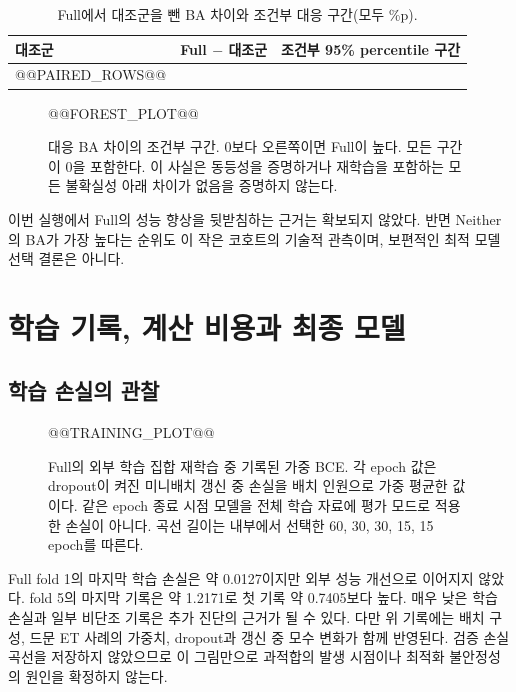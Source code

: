 \documentclass[11pt,a4paper]{article}
\numberwithin{equation}{section}
\begin{document}
\begin{table}[H]\centering\small
\caption{Full에서 대조군을 뺀 BA 차이와 조건부 대응 구간(모두 \%p).}
\begin{tabular}{@{}lrr@{}}\toprule
 대조군 & Full $-$ 대조군 & 조건부 95\% percentile 구간\\\midrule
@@PAIRED_ROWS@@
\bottomrule\end{tabular}\label{tab:paired}
\end{table}

\begin{figure}[H]\centering
@@FOREST_PLOT@@
\caption{대응 BA 차이의 조건부 구간. 0보다 오른쪽이면 Full이 높다.
모든 구간이 0을 포함한다. 이 사실은 동등성을 증명하거나
재학습을 포함하는 모든 불확실성 아래 차이가 없음을 증명하지 않는다.}
\end{figure}
이번 실행에서 Full의 성능 향상을 뒷받침하는 근거는 확보되지 않았다.
반면 Neither의 BA가 가장 높다는 순위도 이 작은 코호트의 기술적 관측이며,
보편적인 최적 모델 선택 결론은 아니다.

\section{학습 기록, 계산 비용과 최종 모델}
\subsection{학습 손실의 관찰}
\begin{figure}[H]\centering
@@TRAINING_PLOT@@
\caption{Full의 외부 학습 집합 재학습 중 기록된 가중 BCE.
각 epoch 값은 dropout이 켜진 미니배치 갱신 중 손실을 배치 인원으로 가중 평균한
값이다. 같은 epoch 종료 시점 모델을 전체 학습 자료에 평가 모드로 적용한 손실이 아니다.
곡선 길이는 내부에서 선택한 60, 30, 30, 15, 15 epoch를 따른다.}
\label{fig:training}
\end{figure}
Full fold 1의 마지막 학습 손실은 약 0.0127이지만 외부 성능 개선으로 이어지지
않았다. fold 5의 마지막 기록은 약 1.2171로 첫 기록 약 0.7405보다 높다.
매우 낮은 학습 손실과 일부 비단조 기록은 추가 진단의 근거가 될 수 있다.
다만 위 기록에는 배치 구성, 드문 ET 사례의 가중치, dropout과 갱신 중 모수 변화가
함께 반영된다. 검증 손실 곡선을 저장하지 않았으므로 이 그림만으로 과적합의
발생 시점이나 최적화 불안정성의 원인을 확정하지 않는다.
\end{document}
